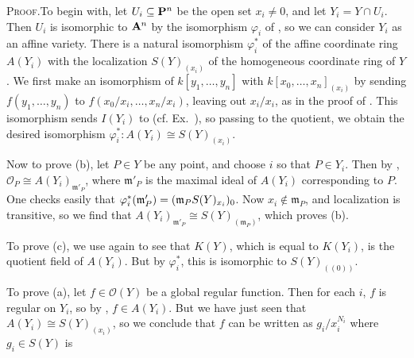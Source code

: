 {\smallskip
\noindent\textsc{Proof.}\enspace \hypertarget{err-I-3.4-charts}{}To begin with, let $U_i\subseteq\mathbf{P}^n$ be the open set $x_i\ne0$, and let $Y_i=Y\cap U_i$. Then $U_i$ is isomorphic to $\AffSpace{n}$ by the isomorphism $\varphi_i$ of , so we can consider $Y_i$ as an affine variety. There is a natural isomorphism $\varphi_i^*$ of the affine coordinate ring $A(Y_i)$ with the localization $S(Y)_{(x_i)}$ of the homogeneous coordinate ring of $Y$. We first make an isomorphism of $k[y_1,\ldots,y_n]$ with $k[x_0,\ldots,x_n]_{(x_i)}$ by sending $f(y_1,\ldots,y_n)$ to $f(x_0/x_i,\ldots,x_n/x_i)$, leaving out $x_i/x_i$, as in the proof of . This isomorphism sends $I(Y_i)$ to \hypertarget{err-I-3.4-localization}{} (cf. Ex.~), so passing to the quotient, we obtain the desired isomorphism $\varphi_i^*\colon A(Y_i)\cong S(Y)_{(x_i)}$.

Now to prove (b), let $P\in Y$ be any point, and choose $i$ so that $P\in Y_i$. Then by , $\mathcal O_P\cong A(Y_i)_{\mathfrak m'_P}$, where $\mathfrak m'_P$ is the maximal ideal of $A(Y_i)$ corresponding to $P$. One checks easily that $\varphi_i^*(\mathfrak m'_P)=(\mathfrak m_P S(Y)_{x_i})_0$. Now $x_i\notin\mathfrak m_P$, and localization is transitive, so we find that $A(Y_i)_{\mathfrak m'_P}\cong S(Y)_{(\mathfrak m_P)}$, which proves (b).

To prove (c), we use  again to see that $K(Y)$, which is equal to $K(Y_i)$, is the quotient field of $A(Y_i)$. But by $\varphi_i^*$, this is isomorphic to $S(Y)_{((0))}$.

To prove (a), let $f\in\mathcal O(Y)$ be a global regular function. Then for each $i$, $f$ is regular on $Y_i$, so by , $f\in A(Y_i)$. But we have just seen that $A(Y_i)\cong S(Y)_{(x_i)}$, so we conclude that $f$ can be written as $g_i/x_i^{N_i}$ where $g_i\in S(Y)$ is%
}
